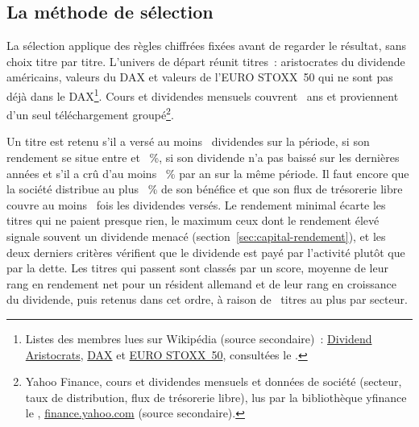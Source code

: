 \subsection{La m\'ethode de s\'election}\label{sec:porte-methode}

La s\'election applique des r\`egles chiffr\'ees fix\'ees avant de regarder le r\'esultat, sans choix
titre par titre. L'univers de d\'epart r\'eunit \UniversTitres{} titres~: \UniversAristocrates{}
aristocrates du dividende am\'ericains, \UniversDax{} valeurs du DAX et \UniversEurostoxx{} valeurs de
l'EURO STOXX~50 qui ne sont pas d\'ej\`a dans le DAX\footnote{Listes des membres lues sur Wikip\'edia
(source secondaire)~: \href{https://en.wikipedia.org/wiki/S\%26P_500_Dividend_Aristocrats}{\IndiceActionsUs{}
Dividend Aristocrats}, \href{https://en.wikipedia.org/wiki/DAX}{DAX} et
\href{https://en.wikipedia.org/wiki/EURO_STOXX_50}{EURO STOXX~50}, consult\'ees le
\DateDonneesPortefeuille.}. Cours et dividendes mensuels couvrent \RegleHistoriqueAns~ans et
proviennent d'un seul t\'el\'echargement group\'e\footnote{Yahoo Finance, cours et dividendes mensuels
et donn\'ees de soci\'et\'e (secteur, taux de distribution, flux de tr\'esorerie libre), lus par la
biblioth\`eque yfinance le \DateDonneesPortefeuille{},
\href{https://finance.yahoo.com}{finance.yahoo.com} (source secondaire).}.


Un titre est retenu s'il a vers\'e au moins \RegleDividendesMin~dividendes sur la p\'eriode, si son
rendement se situe entre \RegleRendementMin{} et \RegleRendementMax~\%, si son dividende n'a pas
baiss\'e sur les \RegleAnneesCroissance{} derni\`eres ann\'ees et s'il a cr\^u d'au moins
\RegleCroissanceMin~\% par an sur la m\^eme p\'eriode. Il faut encore que la soci\'et\'e distribue au plus
\ReglePayoutMax~\% de son b\'en\'efice et que son flux de tr\'esorerie libre couvre au moins
\RegleCouvertureFcf~fois les dividendes vers\'es. Le rendement minimal \'ecarte les titres qui ne
paient presque rien, le maximum ceux dont le rendement \'elev\'e signale souvent un dividende menac\'e
(section~\ref{sec:capital-rendement}), et les deux derniers crit\`eres v\'erifient que le dividende
est pay\'e par l'activit\'e plut\^ot que par la dette. Les titres qui passent sont class\'es par un
score, moyenne de leur rang en rendement net pour un r\'esident allemand et de leur rang en
croissance du dividende, puis retenus dans cet ordre, \`a raison de \RegleSecteurMax~titres au plus
par secteur.

